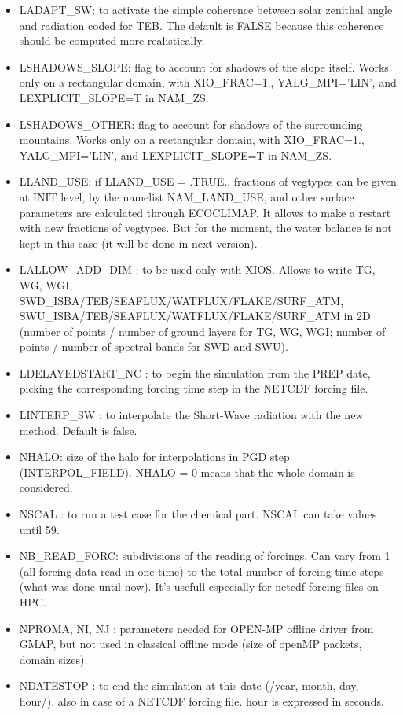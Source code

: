 \begin{itemize}
	\item LADAPT\_SW: to activate the simple coherence between solar zenithal angle and radiation coded for TEB. The default is FALSE because this coherence should be computed more realistically.
	\item LSHADOWS\_SLOPE: flag to account for shadows of the slope itself. Works only on a rectangular domain, with XIO\_FRAC=1., YALG\_MPI=’LIN’, and LEXPLICIT\_SLOPE=T in NAM\_ZS.
	\item LSHADOWS\_OTHER: flag to account for shadows of the surrounding mountains. Works only on a rectangular domain, with XIO\_FRAC=1., YALG\_MPI=’LIN’, and LEXPLICIT\_SLOPE=T in NAM\_ZS.
	\item LLAND\_USE: if LLAND\_USE = .TRUE., fractions of vegtypes can be given at INIT level, by the namelist NAM\_LAND\_USE, and other surface parameters are calculated through ECOCLIMAP. It allows to make a restart with new fractions of vegtypes. But for the moment, the water balance is not kept in this case (it will be done in next version).
	\item LALLOW\_ADD\_DIM : to be used only with XIOS. Allows to write TG, WG, WGI, SWD\_ISBA/TEB/SEAFLUX/WATFLUX/FLAKE/SURF\_ATM, \\ SWU\_ISBA/TEB/SEAFLUX/WATFLUX/FLAKE/SURF\_ATM in 2D (number of points / number of ground layers for TG, WG, WGI; number of points / number of spectral bands for SWD and SWU).
	\item LDELAYEDSTART\_NC : to begin the simulation from the PREP date, picking the corresponding forcing time step in the NETCDF forcing file.
	\item LINTERP\_SW : to interpolate the Short-Wave radiation with the new method. Default is false.
	\item NHALO: size of the halo for interpolations in PGD step (INTERPOL\_FIELD). NHALO = 0 means that the whole domain is considered.
	\item NSCAL : to run a test case for the chemical part. NSCAL can take values until 59.
	\item NB\_READ\_FORC: subdivisions of the reading of forcings. Can vary from 1 (all forcing data read in one time) to the total number of forcing time steps (what was done until now). It's usefull especially for netcdf forcing files on HPC.
	\item NPROMA, NI, NJ : parameters needed for OPEN-MP offline driver from GMAP, but not used in classical offline mode (size of openMP packets, domain sizes).
	\item NDATESTOP : to end the simulation at this date (/year, month, day, hour/), also in case of a NETCDF forcing file. hour is expressed in seconds.

\end{itemize}
